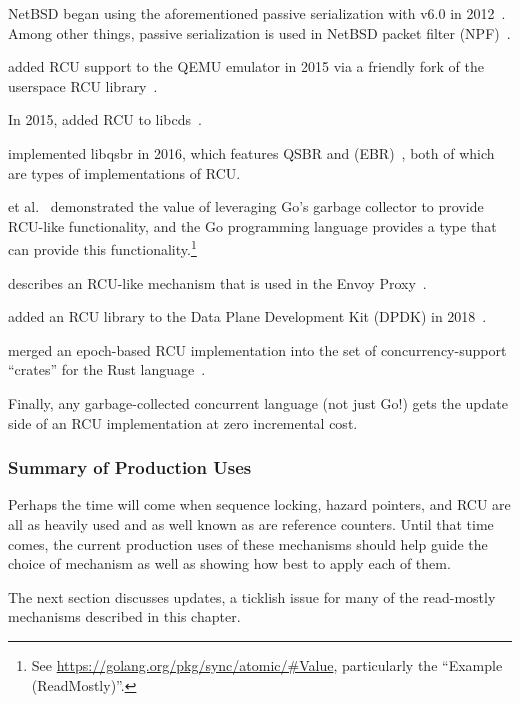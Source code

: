 NetBSD began using the aforementioned passive serialization with v6.0 in
2012~\cite{NetBSD2012pserialize}.
Among other things, passive serialization is used in
NetBSD packet filter (NPF)~\cite{MindaugasRasiukevicius2014NPFRCU}.

 added RCU support to the QEMU emulator in 2015 via a
friendly fork of the userspace RCU
library~\cite{MikeDay2013RCUqemu,PaoloBonzini2013QEMURCU}.

In 2015,  added RCU to
libcds~\cite{MaxKhiszinsky2015C++RCU}.

 implemented libqsbr in 2016, which features
QSBR and 
(EBR)~\cite{MindaugasRasiukevicius2016libqsbr},
both of which are types of implementations of RCU\@.

 et al.~\cite{HarshalSheth2016goRCU}
demonstrated the value of leveraging Go's garbage
collector to provide RCU-like functionality, and
the Go programming language provides a  type that can
provide this functionality.\footnote{
	See \url{https://golang.org/pkg/sync/atomic/\#Value}, particularly
	the ``Example (ReadMostly)''.}

 describes an RCU-like mechanism that is used in the Envoy
Proxy~\cite{MattKlein2017EnvoyRCU}.

 added an RCU library to the Data Plane Development
Kit (DPDK) in 2018~\cite{HonnappaNagarahalli2018dpdkRCU}.

 merged an epoch-based RCU implementation into the
 set of concurrency-support ``crates'' for the Rust
language~\cite{StjepanGlavina2018RustRCU}.

Finally, any garbage-collected concurrent language (not just Go!) gets
the update side of an RCU implementation at zero incremental cost.

\subsubsection{Summary of Production Uses}
\label{sec:defer:Summary of Production Uses}

Perhaps the time will come when sequence locking, hazard pointers, and
RCU are all as heavily used and as well known as are reference counters.
Until that time comes, the current production uses of these mechanisms
should help guide the choice of mechanism as well as showing how best
to apply each of them.

The next section discusses updates, a ticklish issue for many of the
read-mostly mechanisms described in this chapter.
